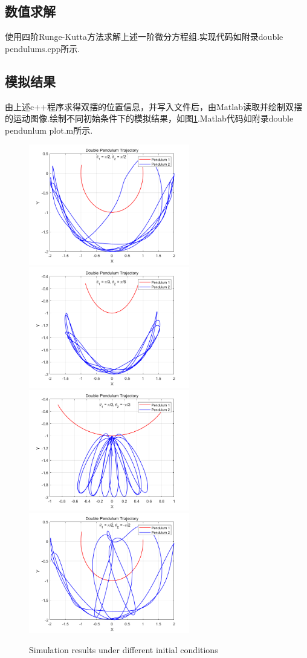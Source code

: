 \documentclass[12pt, a4paper, oneside]{article}
\begin{document}
\subsection{数值求解}
使用四阶Runge-Kutta方法求解上述一阶微分方程组.实现代码如附录double pendulums.cpp所示.

\subsection{模拟结果}
由上述c++程序求得双摆的位置信息，并写入文件后，由Matlab读取并绘制双摆的运动图像.绘制不同初始条件下的模拟结果，如图\ref{fig:simulation_results}.\quad Matlab代码如附录double pendunlum plot.m所示.

\begin{figure}[htbp]
	\centering
	\includegraphics[width = 7cm]{figures/1.png} \qquad
	\includegraphics[width = 7cm]{figures/2.png} \\
	\includegraphics[width = 7cm]{figures/3.png} \qquad
	\includegraphics[width = 7cm]{figures/4.png}
	\caption{Simulation results under different initial conditions}
	\label{fig:simulation_results}
\end{figure}
\end{document}
